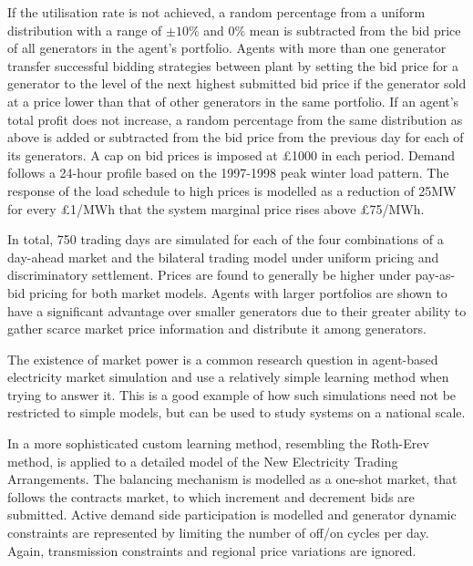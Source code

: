 If the utilisation rate is not achieved, a random percentage from a uniform
distribution with a range of $\pm10\%$ and $0\%$ mean is subtracted from the bid
price of all generators in the agent's portfolio.  Agents with more than one
generator transfer successful bidding strategies between plant by setting the
bid price for a generator to the level of the next highest submitted bid price
if the generator sold at a price lower than that of other generators in the same
portfolio.  If an agent's total profit does not increase, a random percentage
from the same distribution as above is added or subtracted from the bid price
from the previous day for each of its generators.  A cap on bid prices is
imposed at \pounds1000 in each period.  Demand follows a 24-hour profile based
on the 1997-1998 peak winter load pattern.  The response of the load schedule to
high prices is modelled as a reduction of 25MW for every \pounds1/MWh that the
system marginal price rises above \pounds75/MWh.

In total, 750 trading days are simulated for each of the four combinations of a
day-ahead market and the bilateral trading model under uniform pricing and
discriminatory settlement.  Prices are found to generally be higher under
pay-as-bid pricing for both market models.  Agents with larger portfolios are
shown to have a significant advantage over smaller generators due to their
greater ability to gather scarce market price information and distribute it
among generators.

The existence of market power is a common research question in agent-based
electricity market simulation and  use a relatively simple
learning method when trying to answer it.  This is a good example of how such
simulations need not be restricted to simple models, but can be used to study
systems on a national scale.

In  a more sophisticated custom learning method, resembling
the Roth-Erev method, is applied to a detailed model of the New Electricity
Trading Arrangements.  The balancing mechanism is modelled as a one-shot market,
that follows the contracts market, to which increment and decrement bids are
submitted.  Active demand side participation is modelled and generator dynamic
constraints are represented by limiting the number of off/on cycles per day.
Again, transmission constraints and regional price variations are ignored.


